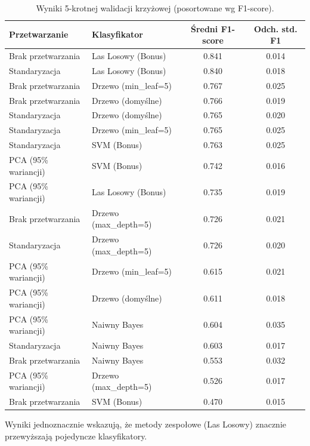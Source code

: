 \documentclass[12pt,a4paper]{article}
\begin{document}
\begin{table}[H]
    \centering
    \caption{Wyniki 5-krotnej walidacji krzyżowej (posortowane wg F1-score).}
    \label{tab:cv_results}
    \small
    \begin{tabular}{llcc}
        \toprule
        \textbf{Przetwarzanie} & \textbf{Klasyfikator} & \textbf{Średni F1-score} & \textbf{Odch. std. F1} \\
        \midrule
        Brak przetwarzania & Las Losowy (Bonus) & 0.841 & 0.014 \\
        Standaryzacja & Las Losowy (Bonus) & 0.840 & 0.018 \\
        Brak przetwarzania & Drzewo (min\_leaf=5) & 0.767 & 0.025 \\
        Brak przetwarzania & Drzewo (domyślne) & 0.766 & 0.019 \\
        Standaryzacja & Drzewo (domyślne) & 0.765 & 0.020 \\
        Standaryzacja & Drzewo (min\_leaf=5) & 0.765 & 0.025 \\
        Standaryzacja & SVM (Bonus) & 0.763 & 0.025 \\
        PCA (95\% wariancji) & SVM (Bonus) & 0.742 & 0.016 \\
        PCA (95\% wariancji) & Las Losowy (Bonus) & 0.735 & 0.019 \\
        Brak przetwarzania & Drzewo (max\_depth=5) & 0.726 & 0.021 \\
        Standaryzacja & Drzewo (max\_depth=5) & 0.726 & 0.020 \\
        PCA (95\% wariancji) & Drzewo (min\_leaf=5) & 0.615 & 0.021 \\
        PCA (95\% wariancji) & Drzewo (domyślne) & 0.611 & 0.018 \\
        PCA (95\% wariancji) & Naiwny Bayes & 0.604 & 0.035 \\
        Standaryzacja & Naiwny Bayes & 0.603 & 0.017 \\
        Brak przetwarzania & Naiwny Bayes & 0.553 & 0.032 \\
        PCA (95\% wariancji) & Drzewo (max\_depth=5) & 0.526 & 0.017 \\
        Brak przetwarzania & SVM (Bonus) & 0.470 & 0.015 \\
        \bottomrule
    \end{tabular}
\end{table}

Wyniki jednoznacznie wskazują, że metody zespołowe (Las Losowy) znacznie przewyższają pojedyncze klasyfikatory.
\end{document}
